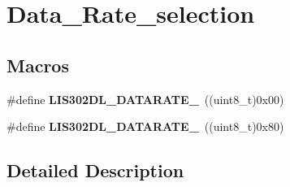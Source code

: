 \hypertarget{group___data___rate__selection}{\section{Data\-\_\-\-Rate\-\_\-selection}
\label{group___data___rate__selection}
}
\subsection*{Macros}
\begin{DoxyCompactItemize}
\item 
\hypertarget{group___data___rate__selection_gad37e615c8111ef3f99ef14b864478ffe}{\#define {\bfseries L\-I\-S302\-D\-L\-\_\-\-D\-A\-T\-A\-R\-A\-T\-E\-\_}~((uint8\-\_\-t)0x00)}\label{group___data___rate__selection_gad37e615c8111ef3f99ef14b864478ffe}

\item 
\hypertarget{group___data___rate__selection_gaf92ab5034a25fee8b887cc1f7e21bb21}{\#define {\bfseries L\-I\-S302\-D\-L\-\_\-\-D\-A\-T\-A\-R\-A\-T\-E\-\_}~((uint8\-\_\-t)0x80)}\label{group___data___rate__selection_gaf92ab5034a25fee8b887cc1f7e21bb21}

\end{DoxyCompactItemize}


\subsection{Detailed Description}
